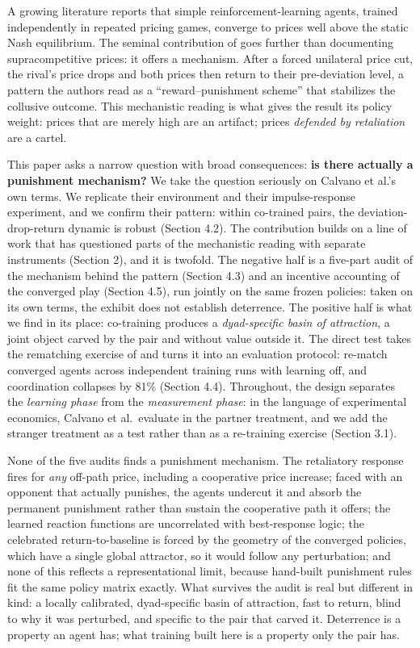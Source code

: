 \documentclass[sigconf]{acmart}
\begin{document}
A growing literature reports that simple reinforcement-learning agents,
trained independently in repeated pricing games, converge to prices well
above the static Nash equilibrium. The seminal contribution of
\citet{calvano2020} goes further than documenting supracompetitive
prices: it offers a mechanism. After a forced unilateral price cut, the
rival's price drops and both prices then return to their pre-deviation
level, a pattern the authors read as a ``reward--punishment scheme''
that stabilizes the collusive outcome. This mechanistic reading is what
gives the result its policy weight: prices that are merely high are an
artifact; prices \emph{defended by retaliation} are a cartel.

This paper asks a narrow question with broad consequences: \textbf{is
there actually a punishment mechanism?} We take the question seriously
on Calvano et al.'s own terms. We replicate their environment and their
impulse-response experiment, and we confirm their pattern: within
co-trained pairs, the deviation-drop-return dynamic is robust (Section
4.2). The contribution builds on a line of work that has questioned
parts of the mechanistic reading with separate instruments (Section 2),
and it is twofold. The negative half is a five-part audit of the
mechanism behind the pattern (Section 4.3) and an incentive accounting
of the converged play (Section 4.5), run jointly on the same frozen
policies: taken on its own terms, the exhibit does not establish
deterrence. The positive half is what we find in its place: co-training
produces a \emph{dyad-specific basin of attraction}, a joint object
carved by the pair and without value outside it. The direct test takes
the rematching exercise of \citet[Section VI.B]{calvano2020} and turns
it into an evaluation protocol: re-match converged agents across
independent training runs with learning off, and coordination collapses
by 81\% (Section 4.4). Throughout, the design separates the
\emph{learning phase} from the \emph{measurement phase}: in the language
of experimental economics, Calvano et al.~evaluate in the partner
treatment, and we add the stranger treatment as a test rather than as a
re-training exercise (Section 3.1).

None of the five audits finds a punishment mechanism. The retaliatory
response fires for \emph{any} off-path price, including a cooperative
price increase; faced with an opponent that actually punishes, the
agents undercut it and absorb the permanent punishment rather than
sustain the cooperative path it offers; the learned reaction functions
are uncorrelated with best-response logic; the celebrated
return-to-baseline is forced by the geometry of the converged policies,
which have a single global attractor, so it would follow any
perturbation; and none of this reflects a representational limit,
because hand-built punishment rules fit the same policy matrix exactly.
What survives the audit is real but different in kind: a locally
calibrated, dyad-specific basin of attraction, fast to return, blind to
why it was perturbed, and specific to the pair that carved it.
Deterrence is a property an agent has; what training built here is a
property only the pair has.
\end{document}
